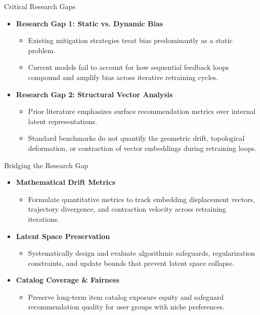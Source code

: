 \documentclass[11pt,aspectratio=43,xcolor=table]{beamer}
\begin{document}
\begin{frame}{Critical Research Gaps}
  \begin{itemize}
    \setlength{\itemsep}{14pt}
    \item \textbf{Research Gap 1: Static vs. Dynamic Bias}
    \begin{itemize}
      \setlength{\itemsep}{5pt}
      \item Existing mitigation strategies treat bias predominantly as a static problem.
      \item Current models fail to account for how sequential feedback loops compound and amplify bias across iterative retraining cycles.
    \end{itemize}

    \item \textbf{Research Gap 2: Structural Vector Analysis}
    \begin{itemize}
      \setlength{\itemsep}{5pt}
      \item Prior literature emphasizes surface recommendation metrics over internal latent representations.
      \item Standard benchmarks do not quantify the geometric drift, topological deformation, or contraction of vector embeddings during retraining loops.
    \end{itemize}
  \end{itemize}
\end{frame}

\begin{frame}{Bridging the Research Gap}
  \begin{itemize}
    \setlength{\itemsep}{12pt}
    \item \textbf{Mathematical Drift Metrics}
    \begin{itemize}
      \setlength{\itemsep}{3pt}
      \item Formulate quantitative metrics to track embedding displacement vectors, trajectory divergence, and contraction velocity across retraining iterations.
    \end{itemize}

    \item \textbf{Latent Space Preservation}
    \begin{itemize}
      \setlength{\itemsep}{3pt}
      \item Systematically design and evaluate algorithmic safeguards, regularization constraints, and update bounds that prevent latent space collapse.
    \end{itemize}

    \item \textbf{Catalog Coverage \& Fairness}
    \begin{itemize}
      \setlength{\itemsep}{3pt}
      \item Preserve long-term item catalog exposure equity and safeguard recommendation quality for user groups with niche preferences.
    \end{itemize}
  \end{itemize}
\end{frame}
\end{document}
